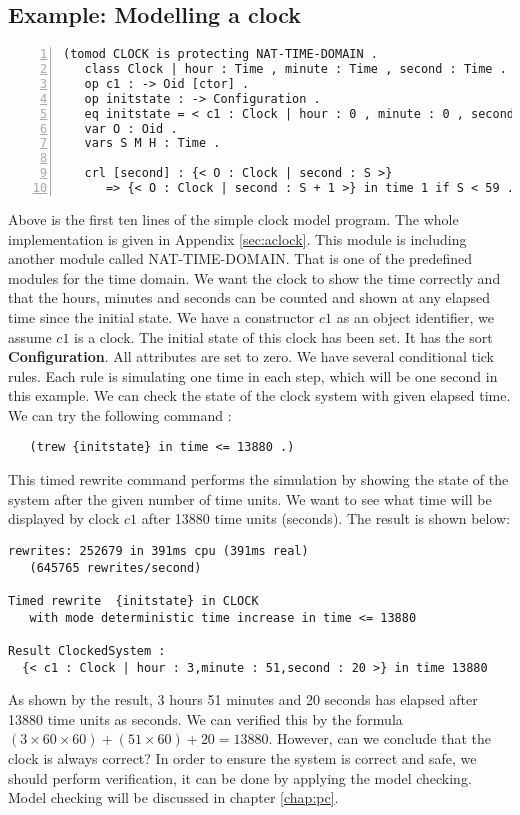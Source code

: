 \documentclass[a4paper,11pt]{report}
\begin{document}
\subsection{Example: Modelling a clock}
\begin{lstlisting}[numbers=left, frame=lines]
(tomod CLOCK is protecting NAT-TIME-DOMAIN .
   class Clock | hour : Time , minute : Time , second : Time .
   op c1 : -> Oid [ctor] .
   op initstate : -> Configuration .
   eq initstate = < c1 : Clock | hour : 0 , minute : 0 , second : 0 > .
   var O : Oid . 
   vars S M H : Time .
	
   crl [second] : {< O : Clock | second : S >} 
      => {< O : Clock | second : S + 1 >} in time 1 if S < 59 .
\end{lstlisting}
Above is the first ten lines of the simple clock model program. The whole implementation is given in Appendix \ref{sec:aclock}. This module is including another module called NAT-TIME-DOMAIN. That is one of the predefined modules for the time domain.
We want the clock to show the time correctly and that the hours, minutes and seconds can be counted and shown at any elapsed time since the initial state. We have a constructor $c1$ as an object identifier, we assume $c1$ is a clock. The initial state of this clock has been set. It has the sort {\bf Configuration}. All attributes are set to zero. We have several conditional tick rules. Each rule is simulating one time in each step, which will be one second in this example. We can check the state of the clock system with given elapsed time. We can try the following command :
\begin{verbatim}
   (trew {initstate} in time <= 13880 .)
\end{verbatim}
This timed rewrite command performs the simulation by showing the state of the system after the given number of time units. We want to see what time will be displayed by clock $c1$ after 13880 time units (seconds). The result is shown below:
\begin{lstlisting}[frame=single,linewidth=15.4cm]
rewrites: 252679 in 391ms cpu (391ms real) 
   (645765 rewrites/second)

Timed rewrite  {initstate} in CLOCK 
   with mode deterministic time increase in time <= 13880

Result ClockedSystem :
  {< c1 : Clock | hour : 3,minute : 51,second : 20 >} in time 13880
\end{lstlisting}
As shown by the result, 3 hours 51 minutes and 20 seconds has elapsed after 13880 time units as seconds.
We can verified this by the formula $(3 \times 60 \times 60) + (51 \times 60) + 20 = 13880 $.
However, can we conclude that the clock is always correct? In order to ensure the system is correct and safe, we should perform verification, it can be done by applying the model checking. Model checking will be discussed in chapter \ref{chap:pc}.
\newpage
\end{document}
